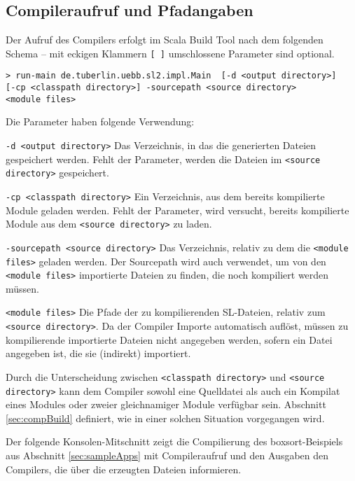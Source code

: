 \documentclass[runningheads]{llncs}
\begin{document}
\subsection{Compileraufruf und Pfadangaben}
\label{sec:compInvoc}

Der Aufruf des Compilers erfolgt im Scala Build Tool nach dem
folgenden Schema -- mit eckigen Klammern \texttt{[ ]} umschlossene
Parameter sind optional.

\begin{verbatim}
> run-main de.tuberlin.uebb.sl2.impl.Main  [-d <output directory>]
[-cp <classpath directory>] -sourcepath <source directory>
<module files>
\end{verbatim}

\noindent Die Parameter haben folgende Verwendung:
\begin{description}
\item{\texttt{-d <output directory>}} Das Verzeichnis, in das die
    generierten Dateien gespeichert werden. Fehlt der Parameter,
    werden die Dateien im \texttt{<source directory>} gespeichert.
\item{\texttt{-cp <classpath directory>}} Ein Verzeichnis, aus dem
    bereits kompilierte Module geladen werden. Fehlt der Parameter,
    wird versucht, bereits kompilierte Module aus dem \texttt{<source
    directory>} zu laden.
\item{\texttt{-sourcepath <source directory>}} Das Verzeichnis,
    relativ zu dem die \texttt{<module files>} geladen werden. Der
    Sourcepath wird auch verwendet, um von den \texttt{<module files>}
    importierte Dateien zu finden, die noch kompiliert werden müssen.
\item{\texttt{<module files>}} Die Pfade der zu kompilierenden
    SL-Dateien, relativ zum \texttt{<source directory>}. Da der
    Compiler Importe automatisch auflöst, müssen zu kompilierende
    importierte Dateien nicht angegeben werden, sofern ein Datei
    angegeben ist, die sie (indirekt) importiert.
\end{description}

Durch die Unterscheidung zwischen \texttt{<classpath
directory>} und \texttt{<source directory>} kann dem Compiler sowohl
eine Quelldatei als auch ein Kompilat eines Modules oder zweier
gleichnamiger Module verfügbar sein. Abschnitt \ref{sec:compBuild}
definiert, wie in einer solchen Situation vorgegangen wird.

Der folgende Konsolen-Mitschnitt zeigt die Compilierung des
boxsort-Beispiels aus Abschnitt \ref{sec:sampleApps} mit
Compileraufruf und den Ausgaben den Compilers, die über die erzeugten
Dateien informieren.
\end{document}
